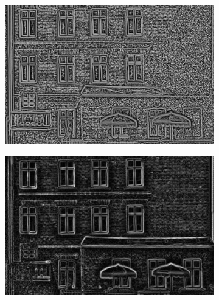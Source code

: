 \documentclass[thesis.tex]{subfiles}
\begin{document}
\begin{figure}[H]
\begin{subfigure}[t]{0.49\textwidth}
        \caption{}
        \label{fig:pixelNormalizationExample5}
    \end{subfigure}
    \begin{subfigure}[t]{0.49\textwidth}
        \includegraphics[width=\textwidth]{img/pixelNormalizationExample6.png}
        \caption{}
        \label{fig:pixelNormalizationExample6}
    \end{subfigure}
    \begin{subfigure}[t]{0.49\textwidth}
        \includegraphics[width=\textwidth]{img/pixelNormalizationExample7.png}
        \caption{}
        \label{fig:pixelNormalizationExample7}
    \end{subfigure}
    \begin{subfigure}[t]{0.49\textwidth}

\end{subfigure}
\end{figure}
\end{document}

